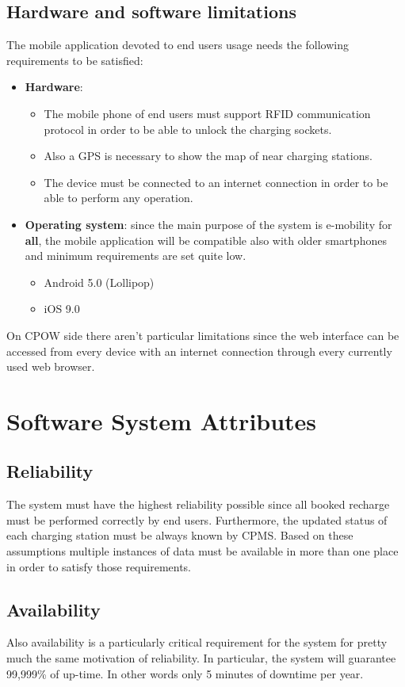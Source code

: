 \documentclass[a4paper]{report}
\begin{document}
\subsection{Hardware and software limitations}
The mobile application devoted to end users usage needs the following requirements to be satisfied:
\begin{itemize}
    \item \textbf{Hardware}:
        \begin{itemize}
            \item The mobile phone of end users must support RFID communication protocol in order to be able to unlock the charging sockets.
            \item Also a GPS is necessary to show the map of near charging stations.
            \item The device must be connected to an internet connection in order to be able to perform any operation.
        \end{itemize}
    \item \textbf{Operating system}: since the main purpose of the system is e-mobility for \textbf{all}, the mobile application will be compatible also with older smartphones and minimum requirements are set quite low.
        \begin{itemize}
            \item Android 5.0 (Lollipop)
            \item iOS 9.0
        \end{itemize}
\end{itemize}
On CPOW side there aren't particular limitations since the web interface can be accessed from every device with an internet connection through every currently used web browser.

\section{Software System Attributes}
\subsection{Reliability}
The system must have the highest reliability possible since all booked recharge must be performed correctly by end users. Furthermore, the updated status of each charging station must be always known by CPMS. Based on these assumptions multiple instances of data must be available in more than one place in order to satisfy those requirements.

\subsection{Availability}
Also availability is a particularly critical requirement for the system for pretty much the same motivation of reliability. In particular, the system will guarantee 99,999\% of up-time. In other words only 5 minutes of downtime per year.
\end{document}

